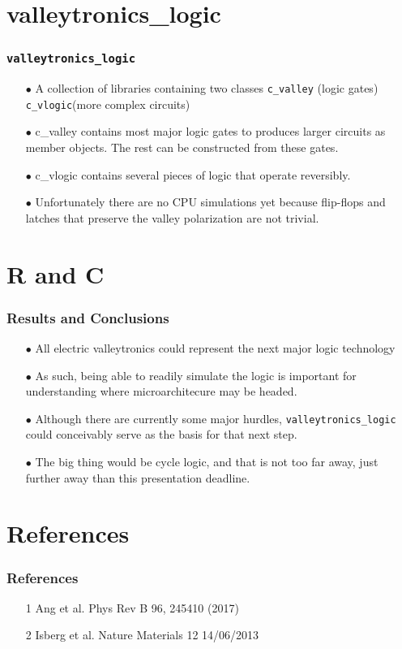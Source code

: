 \documentclass{beamer}
\begin{document}
\section[valleytronics\_logic]{valleytronics\_logic}
\begin{frame}
\frametitle{\texttt{valleytronics\_logic}}
\begin{itemize}
  \item[$\bullet$]A collection of libraries containing two classes \texttt{c\_valley} (logic gates)\texttt{ c\_vlogic}(more complex circuits)
  \vspace*{10pt}
  \item[$\bullet$]c\_valley contains most major logic gates to produces larger circuits as member objects.  The rest can be constructed from these gates.
  \vspace{10pt}
  \item[$\bullet$]c\_vlogic contains several pieces of logic that operate reversibly.
 \vspace{10pt}
\item[$\bullet$]Unfortunately there are no CPU simulations yet because flip-flops and latches that preserve the valley polarization are not trivial.
\end{itemize}

\end{frame}

\section[Results and Conclusions]{R and C}
\begin{frame}
\frametitle{Results and Conclusions}
\begin{itemize}
  \item[$\bullet$]All electric valleytronics could represent the next major logic technology
  \vspace*{10pt}
  \item[$\bullet$] As such, being able to readily simulate the logic is important for understanding where microarchitecure may be headed.
  \vspace{10pt}
  \item[$\bullet$]Although there are currently some major hurdles, \texttt{valleytronics\_logic} could conceivably serve as the basis for that next step. 
 \vspace{10pt}
\item[$\bullet$]The big thing would be cycle logic, and that is not too far away, just further away than this presentation deadline.
\end{itemize}

\end{frame}

\section[References]{References}
\begin{frame}
\frametitle{References}
\begin{itemize}
\item[1] Ang et al. Phys Rev B 96, 245410 (2017)

\vspace*{30pt}
\item[2]Isberg et al. Nature Materials 12 14/06/2013

\vspace*{100pt}
\end{itemize}


\end{frame}
\end{document}
